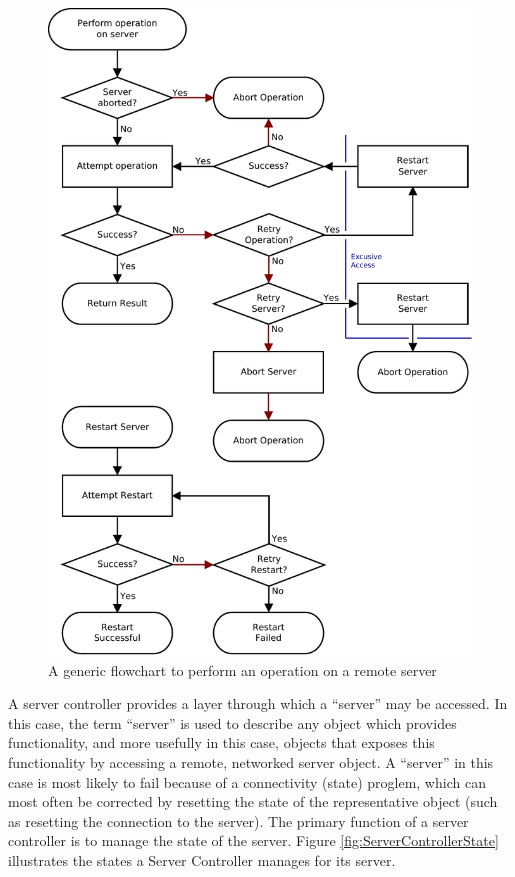 \documentclass[a4paper,oneside,10pt]{report}
\begin{document}
\begin{figure}
	\centering
		\includegraphics[width=1.0\textwidth]{ServerOperationLogic.pdf}
	\caption{A generic flowchart to perform an operation on a remote server}
	\label{fig:SOL}
\end{figure}

A server controller provides a layer through which a ``server'' may be accessed. In this case, the term ``server'' is used to describe any object which provides functionality, and more usefully in this case, objects that exposes this functionality by accessing a remote, networked server object. A ``server'' in this case is most likely to fail because of a connectivity (state) proglem, which can most often be corrected by resetting the state of the representative object (such as resetting the connection to the server). The primary function of a server controller is to manage the state of the server. Figure \ref{fig:ServerControllerState} illustrates the states a Server Controller manages for its server.
\end{document}
